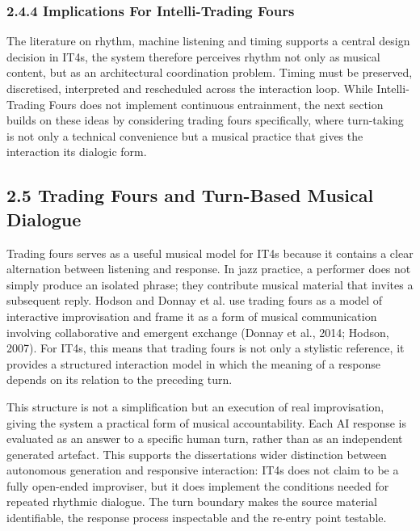 \subsubsection{2.4.4 Implications For Intelli-Trading
Fours}\label{implications-for-intelli-trading-fours}

The literature on rhythm, machine listening and timing supports a
central design decision in IT4s, the system therefore perceives rhythm
not only as musical content, but as an architectural coordination
problem. Timing must be preserved, discretised, interpreted and
rescheduled across the interaction loop. While Intelli-Trading Fours
does not implement continuous entrainment, the next section builds on
these ideas by considering trading fours specifically, where turn-taking
is not only a technical convenience but a musical practice that gives
the interaction its dialogic form.

\subsection{2.5 Trading Fours and Turn-Based Musical
Dialogue}\label{trading-fours-and-turn-based-musical-dialogue}

Trading fours serves as a useful musical model for IT4s because it
contains a clear alternation between listening and response. In jazz
practice, a performer does not simply produce an isolated phrase; they
contribute musical material that invites a subsequent reply. Hodson and
Donnay et al. use trading fours as a model of interactive improvisation
and frame it as a form of musical communication involving collaborative
and emergent exchange (Donnay et al., 2014; Hodson, 2007). For IT4s,
this means that trading fours is not only a stylistic reference, it
provides a structured interaction model in which the meaning of a
response depends on its relation to the preceding turn.

This structure is not a simplification but an execution of real
improvisation, giving the system a practical form of musical
accountability. Each AI response is evaluated as an answer to a specific
human turn, rather than as an independent generated artefact. This
supports the dissertation\textquotesingle s wider distinction between
autonomous generation and responsive interaction: IT4s does not claim to
be a fully open-ended improviser, but it does implement the conditions
needed for repeated rhythmic dialogue. The turn boundary makes the
source material identifiable, the response process inspectable and the
re-entry point testable.

